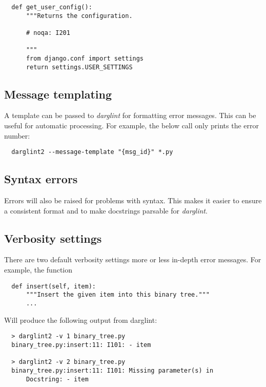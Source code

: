 \documentclass[landscape]{sciposter}
\begin{document}
\begin{multicols}{4}
\begin{verbatim}
  def get_user_config():
      """Returns the configuration.

      # noqa: I201

      """
      from django.conf import settings
      return settings.USER_SETTINGS
\end{verbatim}

        \subsection{Message templating}
            A template can be passed to \textit{darglint} for formatting error
            messages.  This can be useful for automatic processing.  For
            example, the below call only prints the error number:

\begin{verbatim}
  darglint2 --message-template "{msg_id}" *.py
\end{verbatim}

        \subsection{Syntax errors}
            Errors will also be raised for problems with syntax.  This
            makes it easier to ensure a consistent format and to make
            docstrings parsable for \textit{darglint}.

        \subsection{Verbosity settings}
            There are two default verbosity settings more or less in-depth
            error messages.  For example, the function
            \begin{verbatim}
  def insert(self, item):
      """Insert the given item into this binary tree."""
      ...
            \end{verbatim}

            Will produce the following output from darglint:

            \begin{verbatim}
  > darglint2 -v 1 binary_tree.py
  binary_tree.py:insert:11: I101: - item

  > darglint2 -v 2 binary_tree.py
  binary_tree.py:insert:11: I101: Missing parameter(s) in
      Docstring: - item

            \end{verbatim}



\end{multicols}
\end{document}
